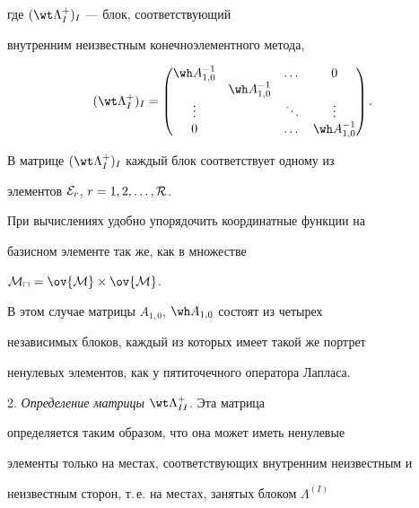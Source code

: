 где $(\wt \Lambda_I^+)_I$ --- блок, соответствующий 


внутренним неизвестным конечноэлементного метода,


$$


(\wt \Lambda_I^+)_I=


\begin{pmatrix}


\wh A_{1,0}^{-1} &&\dotsc &0 \\


& \wh A_{1,0}^{-1} \\


\vdots& & \ddots &\vdots \\


0 &&\dotsc & \wh A_{1,0}^{-1} \\


\end{pmatrix}


.


$$


В матрице $(\wt \Lambda_I^+)_I$ каждый блок соответствует одному из 


элементов ${\cal E}_r$, $r=1,2,\dotsc,\cal R$.





\begin{notes}


При вычислениях удобно упорядочить координатные функции на 


базисном элементе так же, как в множестве 


${\cal M} _\sqcap =\ov {\cal M} \times \ov {\cal M}$. 


В этом случае матрицы $A_{1,0}$, $\wh A_{1,0}$ состоят из четырех 


независимых блоков, каждый из которых имеет такой же портрет 


ненулевых элементов, как у пятиточечного оператора Лапласа.


\end{notes}





2. {\it Определение матрицы} $\wt \Lambda^+_{II}$. Эта матрица 


определяется таким образом, что она может иметь ненулевые 


элементы только на местах, соответствующих внутренним неизвестным и 


неизвестным сторон, т.\,е. на местах, занятых блоком $\Lambda^{(I)}$ 


